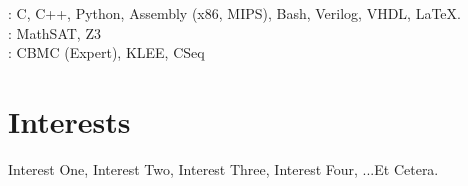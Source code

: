 \documentclass[mm]{simple_style}
\begin{document}
\begin{resume}
: C, C++, Python, Assembly (x86, MIPS), Bash, Verilog, VHDL, \LaTeX.
\\
: MathSAT, Z3 
\\
: CBMC (Expert), KLEE, CSeq
\\
\sectionline

\section{Interests}
Interest One, Interest Two, Interest Three, Interest Four, ...Et Cetera.
\end{resume}
\end{document}
